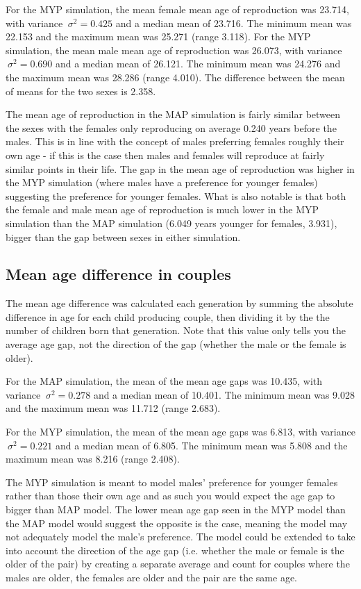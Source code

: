 \documentclass[authoryearcitations]{UoYCSproject}
\begin{document}
For the MYP simulation, the mean female mean age of reproduction was 23.714, with variance $\ \sigma^2 = 0.425 $ and a median mean of 23.716. The minimum mean was 22.153 and the maximum mean was 25.271 (range 3.118). For the MYP simulation, the mean male mean age of reproduction was 26.073, with variance $\ \sigma^2 = 0.690 $ and a median mean of 26.121. The minimum mean was 24.276 and the maximum mean was 28.286 (range 4.010). The difference between the mean of means for the two sexes is 2.358.
 
The mean age of reproduction in the MAP simulation is fairly similar between the sexes with the females only reproducing on average 0.240 years before the males. This is in line with the concept of males preferring females roughly their own age - if this is the case then males and females will reproduce at fairly similar points in their life. The gap in the mean age of reproduction was higher in the MYP simulation (where males have a preference for younger females) suggesting the preference for younger females. What is also notable is that both the female and male mean age of reproduction is much lower in the MYP simulation than the MAP simulation (6.049 years younger for females, 3.931), bigger than the gap between sexes in either simulation.

\subsection{Mean age difference in couples}
The mean age difference was calculated each generation by summing the absolute difference in age for each child producing couple, then dividing it by the the number of children born that generation. Note that this value only tells you the average age gap, not the direction of the gap (whether the male or the female is older).

For the MAP simulation, the mean of the mean age gaps was 10.435, with variance $\ \sigma^2 = 0.278 $ and a median mean of 10.401. The minimum mean was 9.028 and the maximum mean was 11.712 (range 2.683). 

For the MYP simulation, the mean of the mean age gaps was 6.813, with variance $\ \sigma^2 = 0.221 $ and a median mean of 6.805. The minimum mean was 5.808 and the maximum mean was 8.216 (range 2.408).

The MYP simulation is meant to model males' preference for younger females rather than those their own age and as such you would expect the age gap to bigger than MAP model. The lower mean age gap seen in the MYP model than the MAP model would suggest the opposite is the case, meaning the model may not adequately model the male's preference. The model could be extended to take into account the direction of the age gap (i.e. whether the male or female is the older of the pair) by creating a separate average and  count for couples where the males are older, the females are older and the pair are the same age.
\end{document}
